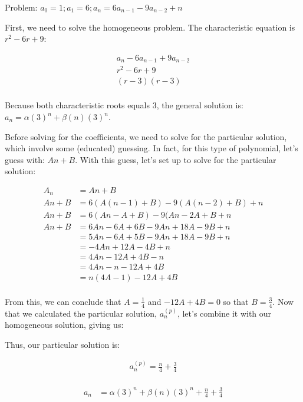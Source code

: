 \documentclass{article}
\begin{document}
Problem: $a_0=1; a_1=6; a_n = 6a_{n-1} - 9a_{n-2} + n$

First, we need to solve the homogeneous problem. The characteristic equation is $r^2 - 6r + 9$:

\begin{align*}
a_n - 6a_{n-1} + 9a_{n-2} \\
r^2 - 6r +9 \\
(r-3)(r-3) \\
\end{align*}

Because both characteristic roots equals 3, the general solution is: $a_n = \alpha(3)^n + \beta(n)(3)^n$. 

Before solving for the coefficients, we need to solve for the particular solution, which involve some (educated) guessing. In fact, for this type of polynomial, let's guess with: $An + B$. With this guess, let's set up to solve for the particular solution:

\begin{align*}
A_n &= An + B \\
An + B &= 6(A(n-1) + B) - 9(A(n-2) + B) + n \\
An + B &= 6(An - A + B) - 9(An - 2A + B + n \\
An + B &= 6An - 6A + 6B - 9An + 18A - 9B + n \\
       &= 5An - 6A + 5B - 9An + 18A - 9B + n \\
       &= -4An + 12A -4B + n \\
       &= 4An - 12A + 4B - n \\
       &= 4An - n - 12A + 4B \\
       &= n(4A-1) - 12A + 4B \\
\end{align*}

From this, we can conclude that $A=\frac{1}{4}$ and $-12A + 4B = 0$ so that $B=\frac{3}{4}$. Now that we calculated the particular solution, $a^{(p)}_n$, let's combine it with our homogeneous solution, giving us:

Thus, our particular solution is:

\begin{align*}
a^{(p)}_n = \frac{n}{4} + \frac{3}{4} \\
\end{align*}

\begin{align*}
a_n &= \alpha(3)^n + \beta(n)(3)^n + \frac{n}{4} + \frac{3}{4} \\
\end{align*}
\end{document}
